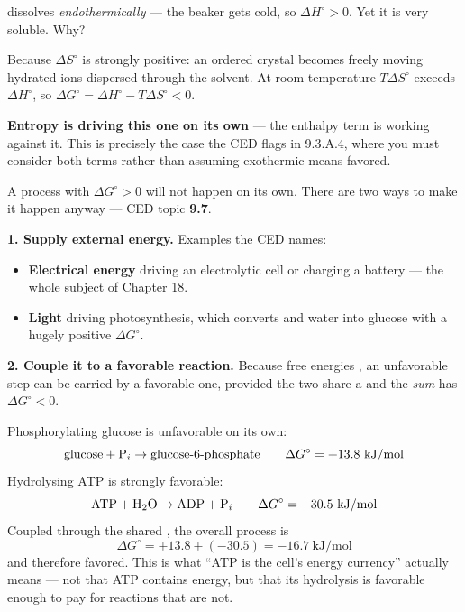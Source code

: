 \documentclass{apchem-notes}
\begin{document}
\begin{workedexample}
 dissolves \emph{endothermically} --- the beaker gets cold, so
$\Delta H^\circ > 0$. Yet it is very soluble. Why?

Because $\Delta S^\circ$ is strongly positive: an ordered crystal becomes
freely moving hydrated ions dispersed through the solvent. At room
temperature $T\Delta S^\circ$ exceeds $\Delta H^\circ$, so
$\Delta G^\circ = \Delta H^\circ - T\Delta S^\circ < 0$.

\textbf{Entropy is driving this one on its own} --- the enthalpy term is
working against it. This is precisely the case the CED flags in 9.3.A.4,
where you must consider both terms rather than assuming exothermic means
favored.
\end{workedexample}



A process with $\Delta G^\circ > 0$ will not happen on its own. There are
two ways to make it happen anyway --- CED topic \textbf{9.7}.

\textbf{1. Supply external energy.} Examples the CED names:

\begin{itemize}[leftmargin=*,itemsep=0.25em]
  \item \textbf{Electrical energy} driving an electrolytic cell or charging
        a battery --- the whole subject of Chapter 18.
  \item \textbf{Light} driving photosynthesis, which converts  and
        water into glucose with a hugely positive $\Delta G^\circ$.
\end{itemize}

\textbf{2. Couple it to a favorable reaction.} Because free energies
, an unfavorable step can be carried by a favorable
one, provided the two share a  and
the \emph{sum} has $\Delta G^\circ < 0$.

\begin{workedexample}
Phosphorylating glucose is unfavorable on its own:
\[ \text{glucose} + \ce{P_i} \to \text{glucose-6-phosphate}
   \qquad \Delta G^\circ = +13.8~\text{kJ/mol} \]
Hydrolysing ATP is strongly favorable:
\[ \ce{ATP} + \ce{H2O} \to \ce{ADP} + \ce{P_i}
   \qquad \Delta G^\circ = -30.5~\text{kJ/mol} \]
Coupled through the shared , the overall process is
\[ \Delta G^\circ = +13.8 + (-30.5) = \mathbf{-16.7}~\text{kJ/mol} \]
and therefore favored. This is what ``ATP is the cell's energy currency''
actually means --- not that ATP contains energy, but that its hydrolysis is
favorable enough to pay for reactions that are not.
\end{workedexample}
\end{document}
